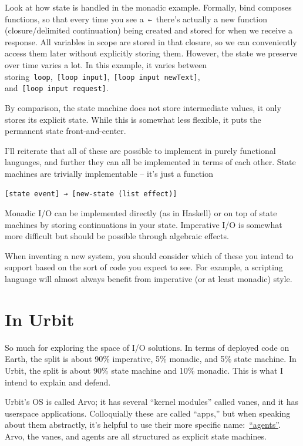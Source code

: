 \documentclass[twoside]{article}
\begin{document}
Look at how state is handled in the monadic example. Formally, bind
composes functions, so that every time you see
a~\texttt{←}~there's actually a new function
(closure/delimited continuation) being created and stored for when we
receive a response. All variables in scope are stored in that closure,
so we can conveniently access them later without explicitly storing
them. However, the state we preserve over time varies a lot. In this
example, it varies between
storing~\texttt{loop},~\texttt{[loop\ input]},~\texttt{[loop\ input\ newText]},
and~\texttt{[loop\ input\ request]}.

By comparison, the state machine does not store intermediate values, it
only stores its explicit state. While this is somewhat less flexible, it
puts the permanent state front-and-center.

I'll reiterate that all of these are possible to implement in purely
functional languages, and further they can all be implemented in terms
of each other. State machines are trivially implementable -- it's just a
function

\begin{lstlisting}[style=listingblock]
[state event] → [new-state (list effect)]
\end{lstlisting}

\noindent
Monadic I/O can be implemented directly (as in Haskell) or on
top of state machines by storing continuations in your state. Imperative
I/O is somewhat more difficult but should be possible through algebraic
effects.

When inventing a new system, you should consider which of these you
intend to support based on the sort of code you expect to see. For
example, a scripting language will almost always benefit from imperative
(or at least monadic) style.

\section{In Urbit}\label{in-urbit}

So much for exploring the space of I/O solutions. In terms of deployed
code on Earth, the split is about 90\% imperative, 5\% monadic, and 5\%
state machine. In Urbit, the split is about 90\% state machine and 10\%
monadic. This is what I intend to explain and defend.

Urbit's OS is called Arvo; it has several ``kernel modules'' called
vanes, and it has userspace applications. Colloquially these are called
``apps,'' but when speaking about them abstractly, it's helpful to use
their more specific
name:~\href{https://developers.urbit.org/reference/glossary/agent}{``agents''}.
Arvo, the vanes, and agents are all structured as explicit state
machines.
\end{document}
